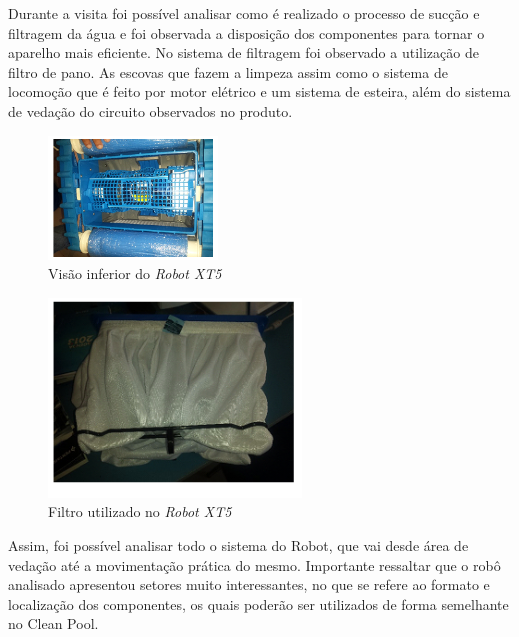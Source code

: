 Durante a visita foi possível analisar como é realizado o processo de sucção e 
filtragem da água e foi observada a disposição dos componentes para tornar o 
aparelho mais eficiente. No sistema de filtragem foi observado a utilização de 
filtro de pano. As escovas que fazem a limpeza assim como o sistema de 
locomoção que é feito por motor elétrico e um sistema de esteira, além do 
sistema de vedação do circuito observados no produto.

\begin{figure}[!h]
   \centering
    \includegraphics[width=0.4\textwidth]{figures/bottom_view_robot.jpg}
    \caption{Visão inferior do \textit{Robot XT5}}
    \label{fig:bottow_view_robot}
\end{figure}

\begin{figure}[!h]
   \centering
    \includegraphics[width=0.6\textwidth]{figures/robot_filter.jpg}
    \caption{Filtro utilizado no \textit{Robot XT5}}
    \label{fig:robot_filter}
\end{figure}

Assim, foi possível analisar todo o sistema do Robot, que vai desde área de 
vedação até a movimentação prática do mesmo. Importante ressaltar que o robô 
analisado apresentou setores muito interessantes, no que se refere ao formato 
e localização dos componentes, os quais poderão ser utilizados de forma 
semelhante no Clean Pool.


